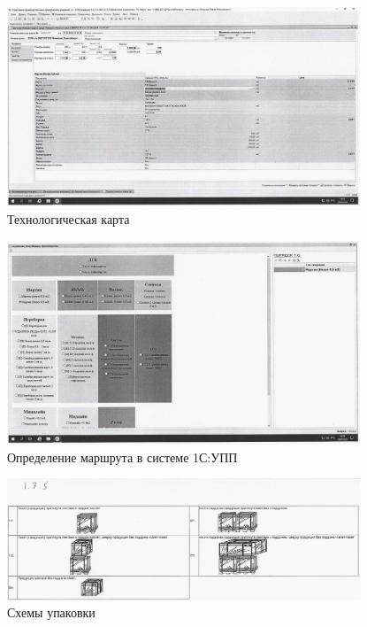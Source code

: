 \begin{figure}
\begin{center}
  \includegraphics[height=0.94\textheight, width=0.94\textwidth, keepaspectratio]{Pics 1/0 ТК в УПП_0001.jpg }
\end{center}
  \caption{Технологическая карта}
  \label{pic:0 ТК в УПП_0001}
\end{figure}

\begin{figure}
\begin{center}
  \includegraphics[height=0.94\textheight, width=0.94\textwidth, keepaspectratio]{Pics 1/0 определение маршрута_0001.jpg}
\end{center}
  \caption{Определение маршрута в системе 1С:УПП}
  \label{pic:0 определение маршрута_0001}
\end{figure}

\begin{figure}
\begin{center}
  \includegraphics[height=0.94\textheight, width=0.94\textwidth, keepaspectratio]{Pics 1/1.7.5 схемы упаковки_0001.jpg}
\end{center}
  \caption{Схемы упаковки}
  \label{pic:1.7.5 схемы упаковки_0001}
\end{figure}

